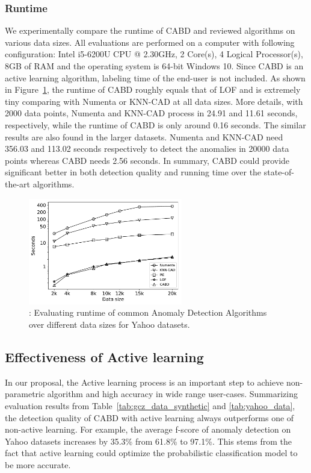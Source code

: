 \subsubsection{Runtime}
We experimentally compare the runtime of CABD and reviewed algorithms on various data sizes. All evaluations are performed on a computer with following configuration: Intel i5-6200U CPU @ 2.30GHz, 2 Core(s), 4 Logical Processor(s), 8GB of RAM and the operating system is 64-bit Windows 10. Since CABD is an active learning algorithm, labeling time of the end-user is not included. As shown in Figure~\ref{fig:comapration_timerunning}, the runtime of CABD roughly equals that of LOF and is extremely tiny comparing with Numenta or KNN-CAD at all data sizes. More details, with 2000 data points, Numenta and KNN-CAD process in 24.91 and 11.61 seconds, respectively, while the runtime of CABD is only around 0.16 seconds. The similar results are also found in the larger datasets. Numenta and KNN-CAD need 356.03 and 113.02 seconds respectively to detect the anomalies in 20000 data points whereas CABD needs 2.56 seconds. In summary, CABD could provide significant better in both detection quality and running time over the state-of-the-art algorithms.

\begin{figure}[h]
	\centering
	\includegraphics[width=0.6\textwidth]{Part3/Chapter7/figures/time_running_evaluation.pdf}
	\caption{ : Evaluating runtime of common Anomaly Detection Algorithms over different data sizes for Yahoo datasets.}
	\label{fig:comapration_timerunning}
\end{figure}

\subsection{Effectiveness of Active learning}

In our proposal, the Active learning process is an important step to achieve non-parametric algorithm and high accuracy in wide range user-cases. Summarizing evaluation results from Table~\ref{tab:gcz_data_synthetic} and \ref{tab:yahoo_data}, the detection quality of CABD with active learning always outperforms one of non-active learning. For example, the average f-score of anomaly detection on Yahoo datasets increases by 35.3\% from 61.8\% to 97.1\%. This stems from the fact that active learning could optimize the probabilistic classification model to be more accurate. \\

